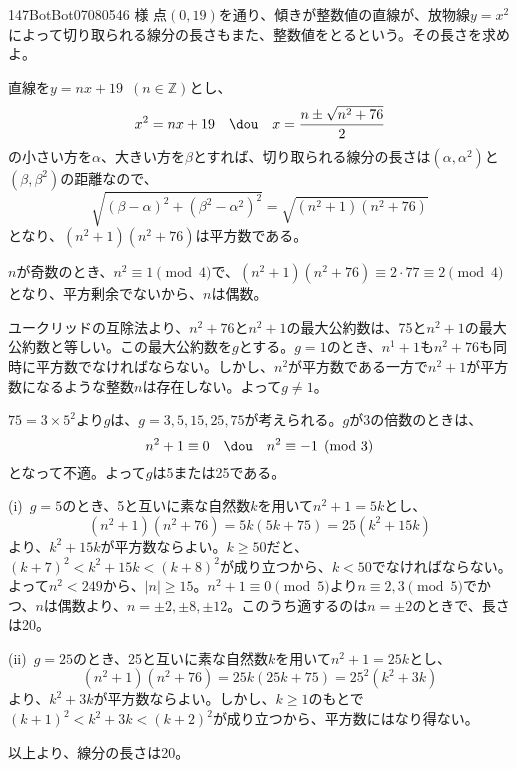 \begin{thm}{147}{}{BotBot07080546 様}
 点$(0,19)$を通り、傾きが整数値の直線が、放物線$y=x^2$によって切り取られる線分の長さもまた、整数値をとるという。その長さを求めよ。
\end{thm}

直線を$y=nx+19$~$(n\in\mathbb{Z})$とし、
\[ x^2=nx+19 \quad\dou\quad x=\frac{n\pm\sqrt{n^2+76}}{2} \]
の小さい方を$\alpha$、大きい方を$\beta$とすれば、切り取られる線分の長さは$(\alpha, \alpha^2)$と$(\beta, \beta^2)$の距離なので、
\[ \sqrt{(\beta-\alpha)^2+(\beta^2-\alpha^2)^2} = \sqrt{(n^2+1)(n^2+76)} \]
となり、$(n^2+1)(n^2+76)$は平方数である。

$n$が奇数のとき、$n^2\equiv 1 \pmod{4}$で、$(n^2+1)(n^2+76)\equiv 2\cdot 77 \equiv 2 \pmod{4}$となり、平方剰余でないから、$n$は偶数。

ユークリッドの互除法より、$n^2+76$と$n^2+1$の最大公約数は、75と$n^2+1$の最大公約数と等しい。この最大公約数を$g$とする。$g=1$のとき、$n^1+1$も$n^2+76$も同時に平方数でなければならない。しかし、$n^2$が平方数である一方で$n^2+1$が平方数になるような整数$n$は存在しない。よって$g\neq 1$。

$75=3\times 5^2$より$g$は、$g=3, 5, 15, 25, 75$が考えられる。$g$が3の倍数のときは、
\[ n^2+1\equiv 0 \quad\dou\quad n^2\equiv -1 \pmod{3} \]
となって不適。よって$g$は5または25である。

(i)~$g=5$のとき、5と互いに素な自然数$k$を用いて$n^2+1=5k$とし、
\[ (n^2+1)(n^2+76)=5k(5k+75)=25(k^2+15k) \]
より、$k^2+15k$が平方数ならよい。$k\ge 50$だと、$(k+7)^2<k^2+15k<(k+8)^2$が成り立つから、$k<50$でなければならない。よって$n^2<249$から、$|n|\ge 15$。$n^2+1\equiv 0 \pmod{5}$より$n\equiv 2, 3 \pmod{5}$でかつ、$n$は偶数より、$n=\pm2, \pm8, \pm12$。このうち適するのは$n=\pm 2$のときで、長さは20。

(ii)~$g=25$のとき、25と互いに素な自然数$k$を用いて$n^2+1=25k$とし、
\[ (n^2+1)(n^2+76)=25k(25k+75)=25^2(k^2+3k) \]
より、$k^2+3k$が平方数ならよい。しかし、$k\ge 1$のもとで$(k+1)^2<k^2+3k<(k+2)^2$が成り立つから、平方数にはなり得ない。

以上より、線分の長さは20。